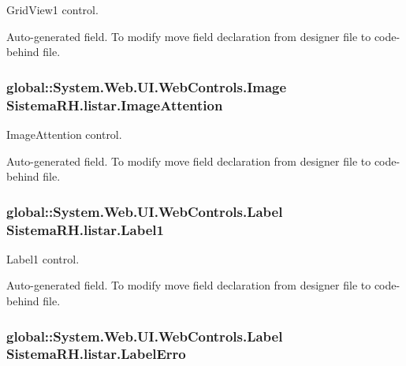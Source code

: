 GridView1 control. 

Auto-\/generated field. To modify move field declaration from designer file to code-\/behind file. \hypertarget{class_sistema_r_h_1_1listar_ad8d65c5b374cd071739c7e011d564984}{
\subsubsection[{ImageAttention}]{\setlength{\rightskip}{0pt plus 5cm}global::System.Web.UI.WebControls.Image {\bf SistemaRH.listar.ImageAttention}}}
\label{class_sistema_r_h_1_1listar_ad8d65c5b374cd071739c7e011d564984}


ImageAttention control. 

Auto-\/generated field. To modify move field declaration from designer file to code-\/behind file. \hypertarget{class_sistema_r_h_1_1listar_a9e923dea80a39d42e26a2ccd5e8e163f}{
\subsubsection[{Label1}]{\setlength{\rightskip}{0pt plus 5cm}global::System.Web.UI.WebControls.Label {\bf SistemaRH.listar.Label1}}}
\label{class_sistema_r_h_1_1listar_a9e923dea80a39d42e26a2ccd5e8e163f}


Label1 control. 

Auto-\/generated field. To modify move field declaration from designer file to code-\/behind file. \hypertarget{class_sistema_r_h_1_1listar_a099249f6f879d191f79410dcf13b5027}{
\subsubsection[{LabelErro}]{\setlength{\rightskip}{0pt plus 5cm}global::System.Web.UI.WebControls.Label {\bf SistemaRH.listar.LabelErro}}}
\label{class_sistema_r_h_1_1listar_a099249f6f879d191f79410dcf13b5027}


